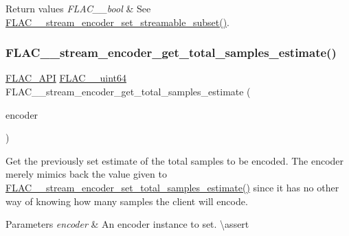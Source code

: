 \begin{DoxyRetVals}{Return values}
{\em F\+L\+A\+C\+\_\+\+\_\+bool} & See \mbox{\hyperlink{group__flac__stream__encoder_ga163f1acfe8b6b8ae849f0f4f7c0708f4}{F\+L\+A\+C\+\_\+\+\_\+stream\+\_\+encoder\+\_\+set\+\_\+streamable\+\_\+subset()}}. \\
\hline
\end{DoxyRetVals}
\mbox{\label{group__flac__stream__encoder_ga8b206187a5b2a261ad4b5067fa43525b}} 
\subsubsection{\texorpdfstring{FLAC\_\_stream\_encoder\_get\_total\_samples\_estimate()}{FLAC\_\_stream\_encoder\_get\_total\_samples\_estimate()}}
{\footnotesize\ttfamily \mbox{\hyperlink{group__flac__export_ga56ca07df8a23310707732b1c0007d6f5}{F\+L\+A\+C\+\_\+\+A\+PI}} \mbox{\hyperlink{ordinals_8h_aa78c8c70a3eb8a58af7436f278acde8e}{F\+L\+A\+C\+\_\+\+\_\+uint64}} F\+L\+A\+C\+\_\+\+\_\+stream\+\_\+encoder\+\_\+get\+\_\+total\+\_\+samples\+\_\+estimate (\begin{DoxyParamCaption}\item[{const \mbox{\hyperlink{struct_f_l_a_c_____stream_encoder}{F\+L\+A\+C\+\_\+\+\_\+\+Stream\+Encoder}} $\ast$}]{encoder }\end{DoxyParamCaption})}

Get the previously set estimate of the total samples to be encoded. The encoder merely mimics back the value given to \mbox{\hyperlink{group__flac__stream__encoder_ga0d3f45052f2f7379c73e2b027c7f956c}{F\+L\+A\+C\+\_\+\+\_\+stream\+\_\+encoder\+\_\+set\+\_\+total\+\_\+samples\+\_\+estimate()}} since it has no other way of knowing how many samples the client will encode.


\begin{DoxyParams}{Parameters}
{\em encoder} & An encoder instance to set. \textbackslash{}assert 
\begin{DoxyCode}{1}
\end{DoxyCode}
 \\
\hline
\end{DoxyParams}

